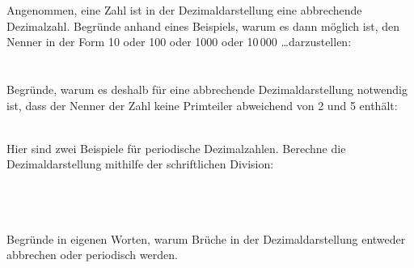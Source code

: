Angenommen, eine Zahl ist in der Dezimaldarstellung eine abbrechende Dezimalzahl.
Begründe anhand eines Beispiels, warum es dann möglich ist, den Nenner in der Form 10 oder 100 oder 1000 oder 10\,000 \ldots darzustellen:\\~\\
\\

Begründe, warum es deshalb für eine abbrechende Dezimaldarstellung notwendig ist, dass der Nenner der Zahl keine Primteiler abweichend von 2 und 5 enthält:\\~\\

\newpage
\begin{xmpl}
	Hier sind zwei Beispiele für periodische Dezimalzahlen. Berechne die Dezimaldarstellung mithilfe der schriftlichen Division:\\
 
	\\~\\
	\\
\end{xmpl}

Begründe in eigenen Worten, warum Brüche in der Dezimaldarstellung entweder abbrechen oder periodisch werden.\\

